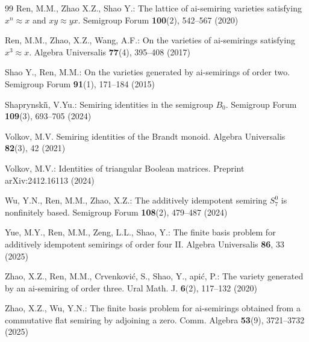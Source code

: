 \documentclass[reqno]{amsart}
\theoremstyle{plain}
\theoremstyle{definition}
\begin{document}
\begin{thebibliography}{99}
Ren, M.M., Zhao X.Z., Shao Y.:
The lattice of ai-semiring varieties satisfying $x^n\approx x$ and $xy\approx yx$.
Semigroup Forum {\bf 100}(2), 542--567 (2020)

Ren, M.M., Zhao, X.Z., Wang, A.F.: On the varieties of ai-semirings satisfying $x^3 \approx x$.
Algebra Universalis {\bf 77}(4), 395--408 (2017)

Shao Y., Ren, M.M.: On the varieties generated by ai-semirings of order two.
Semigroup Forum {\bf 91}(1), 171--184 (2015)

Shaprynski\v{\i}, V.Yu.: Semiring identities in the semigroup $B_0$.
Semigroup Forum {\bf 109}(3), 693--705 (2024)

Volkov, M.V. Semiring identities of the Brandt monoid. Algebra Universalis {\bf82}(3), 42 (2021)

 Volkov, M.V.:
Identities of triangular Boolean matrices.
Preprint arXiv:2412.16113 (2024)

Wu, Y.N., Ren, M.M., Zhao, X.Z.:
The additively idempotent semiring $S^0_7$  is nonfinitely based.
Semigroup Forum {\bf 108}(2), 479--487 (2024)

Yue, M.Y., Ren, M.M., Zeng, L.L., Shao, Y.: The finite basis problem for additively idempotent semirings
of order four II. Algebra Universalis {\bf 86}, 33 (2025)

Zhao, X.Z., Ren, M.M., Crvenkovi{\' c}, S., Shao, Y., \DH api{\' c}, P.:
The variety generated by an ai-semiring of order three.
Ural Math. J. {\bf 6}(2), 117--132 (2020)

Zhao, X.Z., Wu, Y.N.:
The finite basis problem for ai-semirings obtained from a commutative flat semiring by adjoining a zero.
Comm. Algebra {\bf 53}(9), 3721--3732 (2025)
\end{thebibliography}
\end{document}
